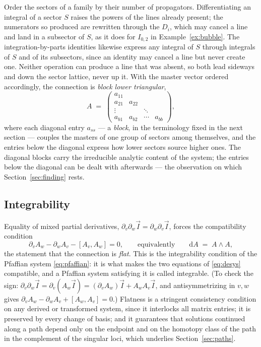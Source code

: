 \documentclass[11pt]{article}
\newcommand{\dd}{\mathrm{d}}
\begin{document}
Order the sectors of a family by their number of propagators.
Differentiating an integral of a sector $S$ raises the powers of the
lines already present; the numerators so produced are rewritten
through the $D_i$, which may cancel a line and land in a subsector of
$S$, as it does for $I_{0,2}$ in Example~\ref{ex:bubble}.  The
integration-by-parts identities likewise express any integral of $S$
through integrals of $S$ and of its subsectors, since an identity may
cancel a line but never create one.  Neither operation can produce a
line that was absent, so both lead sideways and down the sector
lattice, never up it.  With the master
vector ordered accordingly, the connection is
\emph{block lower triangular},
\begin{equation}
  A \;=\;
  \begin{pmatrix}
    a_{11} & & & \\
    a_{21} & a_{22} & & \\
    \vdots & & \ddots & \\
    a_{b1} & a_{b2} & \cdots & a_{bb}
  \end{pmatrix},
  \label{eq:blocktriangular}
\end{equation}
where each diagonal entry $a_{ss}$ --- a \emph{block}, in the
terminology fixed in the next section --- couples the masters of one
group of sectors among themselves, and the entries below the
diagonal express how lower sectors source higher ones.  The diagonal
blocks carry the irreducible analytic content of the system; the
entries below the diagonal can be dealt with afterwards --- the
observation on which Section~\ref{sec:finding} rests.

\subsection{Integrability}
\label{sec:integrability}

Equality of mixed partial derivatives,
$\partial_v\partial_w \vec I = \partial_w\partial_v \vec I$, forces
the compatibility condition
\begin{equation}
  \partial_v A_w - \partial_w A_v - [A_v, A_w] = 0,
  \qquad\text{equivalently}\qquad
  \dd A \;=\; A \wedge A ,
  \label{eq:flatness}
\end{equation}
the statement that the connection is \emph{flat}.  This is the
integrability condition of the Pfaffian system \eqref{eq:pfaffian}:
it is what makes the two equations of \eqref{eq:desys} compatible,
and a Pfaffian system satisfying it is called integrable.  (To check
the sign: $\partial_v\partial_w \vec I = \partial_v(A_w \vec I) =
(\partial_v A_w)\vec I + A_w A_v \vec I$, and antisymmetrizing in
$v,w$ gives $\partial_v A_w - \partial_w A_v + [A_w, A_v] = 0$.)
Flatness is a stringent consistency condition on any derived or
transformed system, since it interlocks all matrix entries; it is
preserved by every change of basis; and it guarantees that solutions
continued along a path depend only on the endpoint and on the
homotopy class of the path in the complement of the singular loci,
which underlies Section~\ref{sec:paths}.
\end{document}
